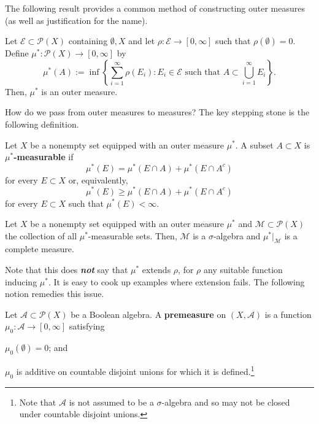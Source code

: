 \documentclass[11pt]{article}
\renewcommand{\A}{\mathcal{A}}
\newcommand{\E}{\mathcal{E}}
\newcommand{\M}{\mathcal{M}}
\renewcommand{\P}{\mathcal{P}}
\newcommand{\ssum}{\displaystyle\sum}
\begin{document}
The following result provides a common method of constructing outer measures (as well as justification for the name).

\begin{proposition}
Let $\E\subset\P(X)$ containing $\emptyset,X$ and let $\rho: \E\to[0,\infty]$ such that $\rho(\emptyset)=0$. Define $\mu^*: \P(X)\to[0,\infty]$ by 
$$\mu^*(A):=\inf\left\{\ssum_{i=1}^{\infty}\rho(E_i) : E_i\in\E\textrm{ such that }A\subset\bigcup_{i=1}^{\infty}E_i\right\}.$$
Then, $\mu^*$ is an outer measure.
\end{proposition}

How do we pass from outer measures to measures? The key stepping stone is the following definition.

\begin{definition}
Let $X$ be a nonempty set equipped with an outer measure $\mu^*$. A subset $A\subset X$ is \textbf{$\mu^*$-measurable} if 
$$\mu^*(E)=\mu^*(E\cap A)+\mu^*(E\cap A^c)$$
for every $E\subset X$ or, equivalently, 
$$\mu^*(E)\geq\mu^*(E\cap A)+\mu^*(E\cap A^c)$$
for every $E\subset X$ such that $\mu^*(E)<\infty$.
\end{definition}

\begin{theorem}
Let $X$ be a nonempty set equipped with an outer measure $\mu^*$ and $\M\subset\P(X)$ the collection of all $\mu^*$-measurable sets. Then, $\M$ is a $\sigma$-algebra and $\mu^*|_{\M}$ is a complete measure.
\end{theorem}

\begin{remark}
Note that this does \emph{\textbf{not}} say that $\mu^*$ extends $\rho$, for $\rho$ any suitable function inducing $\mu^*$. It is easy to cook up examples where extension fails. The following notion remedies this issue.
\end{remark}

\begin{definition}
Let $\A\subset\P(X)$ be a Boolean algebra. A \textbf{premeasure} on $(X,\A)$ is a function $\mu_0: \A\to[0,\infty]$ satisfying
\begin{enum}{\arabic}
\item $\mu_0(\emptyset)=0$; and
\item $\mu_0$ is additive on countable disjoint unions for which it is defined.\footnote{Note that $\A$ is not assumed to be a $\sigma$-algebra and so may not be closed under countable disjoint unions.}
\end{enum}
\end{definition}
\end{document}
